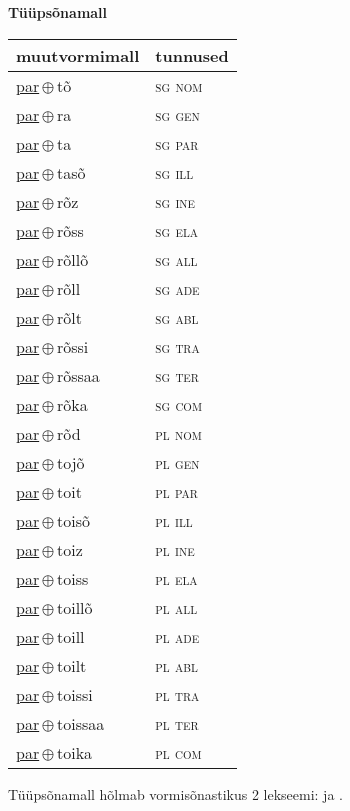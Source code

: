 

\vspace{3.5em}
\noindent \begin{minipage}{\textwidth}
\noindent \textbf{Tüüpsõnamall \,}\\

\begin{sideways}
\begin{tabular}{l l}
muutvormimall & tunnused \\
\hline
\underline{par}\,$\oplus$\,tõ & \textsc{ sg nom } \\
\underline{par}\,$\oplus$\,ra & \textsc{ sg gen } \\
\underline{par}\,$\oplus$\,ta & \textsc{ sg par } \\
\underline{par}\,$\oplus$\,tasõ & \textsc{ sg ill } \\
\underline{par}\,$\oplus$\,rõz & \textsc{ sg ine } \\
\underline{par}\,$\oplus$\,rõss & \textsc{ sg ela } \\
\underline{par}\,$\oplus$\,rõllõ & \textsc{ sg all } \\
\underline{par}\,$\oplus$\,rõll & \textsc{ sg ade } \\
\underline{par}\,$\oplus$\,rõlt & \textsc{ sg abl } \\
\underline{par}\,$\oplus$\,rõssi & \textsc{ sg tra } \\
\underline{par}\,$\oplus$\,rõssaa & \textsc{ sg ter } \\
\underline{par}\,$\oplus$\,rõka & \textsc{ sg com } \\
\underline{par}\,$\oplus$\,rõd & \textsc{ pl nom } \\
\underline{par}\,$\oplus$\,tojõ & \textsc{ pl gen } \\
\underline{par}\,$\oplus$\,toit & \textsc{ pl par } \\
\underline{par}\,$\oplus$\,toisõ & \textsc{ pl ill } \\
\underline{par}\,$\oplus$\,toiz & \textsc{ pl ine } \\
\underline{par}\,$\oplus$\,toiss & \textsc{ pl ela } \\
\underline{par}\,$\oplus$\,toillõ & \textsc{ pl all } \\
\underline{par}\,$\oplus$\,toill & \textsc{ pl ade } \\
\underline{par}\,$\oplus$\,toilt & \textsc{ pl abl } \\
\underline{par}\,$\oplus$\,toissi & \textsc{ pl tra } \\
\underline{par}\,$\oplus$\,toissaa & \textsc{ pl ter } \\
\underline{par}\,$\oplus$\,toika & \textsc{ pl com } \\
\end{tabular}
\end{sideways}
\label{tab:tüüpsõnamall-partõ}

\end{minipage}

 
\vspace{1em}
\noindent Tüüpsõnamall  hõlmab vormisõnastikus 2 lekseemi:  ja .

